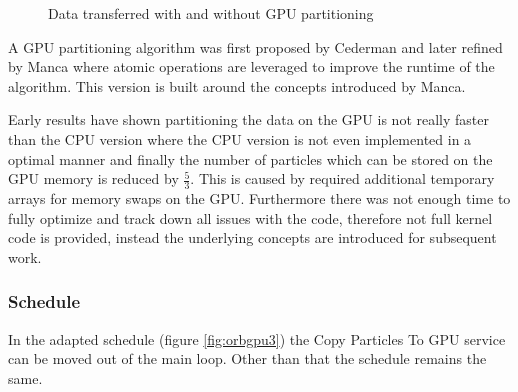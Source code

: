 \documentclass[]{article}
\begin{document}
\begin{figure}[H]
	\begin{center}
		\caption{Data transferred with and without GPU partitioning}
		\label{fig:transfer}
	\end{center}
\end{figure}


A GPU partitioning algorithm was first proposed by Cederman \cite{GPUQ} and later refined by Manca \cite{CUDAQ} where atomic operations are leveraged to improve the runtime of the algorithm. This version is built around the concepts introduced by Manca. 

Early results have shown partitioning the data on the GPU is not really faster than the CPU version where the CPU version is not even implemented in a optimal manner and finally the number of particles which can be stored on the GPU memory is reduced by $\frac{5}{3}$. This is caused by required additional temporary arrays for memory swaps on the GPU. Furthermore there was not enough time to fully optimize and track down all issues with the code, therefore not full kernel code is provided, instead the underlying concepts are introduced for subsequent work. 

\subsubsection{Schedule}

In the adapted schedule (figure \ref{fig:orbgpu3}) the Copy Particles To GPU service can be moved out of the main loop. Other than that the schedule remains the same. 
\end{document}
